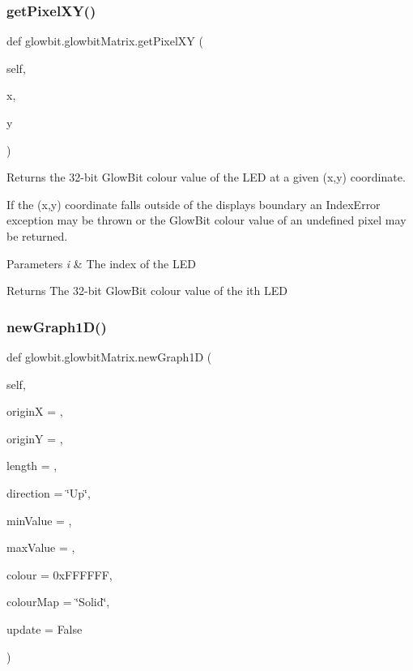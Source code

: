 \subsubsection{\texorpdfstring{get\+Pixel\+X\+Y()}{getPixelXY()}}
{\footnotesize\ttfamily def glowbit.\+glowbit\+Matrix.\+get\+Pixel\+XY (\begin{DoxyParamCaption}\item[{}]{self,  }\item[{}]{x,  }\item[{}]{y }\end{DoxyParamCaption})}



Returns the 32-\/bit Glow\+Bit colour value of the L\+ED at a given (x,y) coordinate. 

If the (x,y) coordinate falls outside of the display\textquotesingle{}s boundary an Index\+Error exception may be thrown or the Glow\+Bit colour value of an undefined pixel may be returned.


\begin{DoxyParams}{Parameters}
{\em i} & The index of the L\+ED \\
\hline
\end{DoxyParams}
\begin{DoxyReturn}{Returns}
The 32-\/bit Glow\+Bit colour value of the i\textquotesingle{}th L\+ED 
\end{DoxyReturn}
\mbox{\label{classglowbit_1_1glowbitMatrix_afa354570d11280b56d276c45d98021ef}} 
\subsubsection{\texorpdfstring{new\+Graph1\+D()}{newGraph1D()}}
{\footnotesize\ttfamily def glowbit.\+glowbit\+Matrix.\+new\+Graph1D (\begin{DoxyParamCaption}\item[{}]{self,  }\item[{}]{originX = {},  }\item[{}]{originY = {},  }\item[{}]{length = {},  }\item[{}]{direction = {\ttfamily \char`\"{}Up\char`\"{}},  }\item[{}]{min\+Value = {},  }\item[{}]{max\+Value = {},  }\item[{}]{colour = {\ttfamily 0xFFFFFF},  }\item[{}]{colour\+Map = {\ttfamily \char`\"{}Solid\char`\"{}},  }\item[{}]{update = {\ttfamily False} }\end{DoxyParamCaption})}



